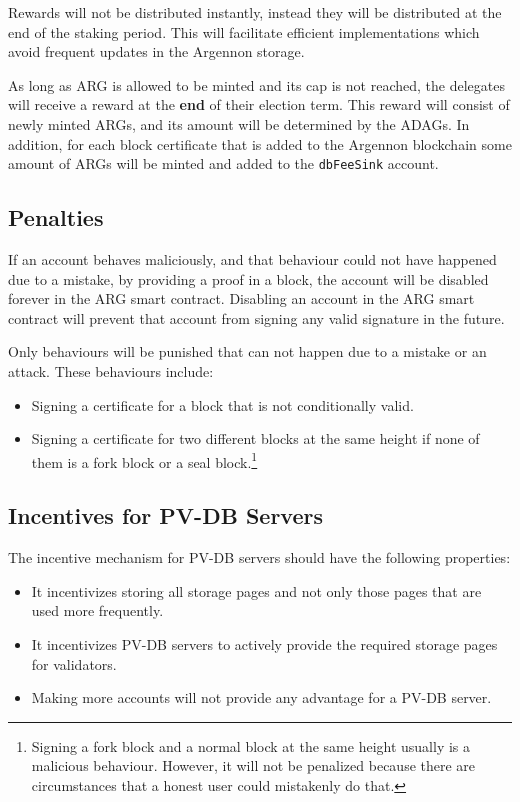 Rewards will not be distributed instantly, instead they will be distributed at the end of the staking period.
This will facilitate efficient implementations which avoid frequent updates in the Argennon storage.

As long as ARG is allowed to be minted and its cap is not reached, the delegates will receive a reward at the
\textbf{end} of their election term. This reward will consist of newly minted ARGs, and its amount will be
determined by the ADAGs. In addition, for each block certificate that is added to the Argennon blockchain some amount
of ARGs will be minted and added to the \texttt{dbFeeSink} account.

\subsection{Penalties}\label{subsec:penalties}

If an account behaves maliciously, and that behaviour could not have happened due to a mistake, by providing a proof
in a block, the account will be disabled forever in the ARG smart contract. Disabling an account in the
ARG smart contract will prevent that account from signing any valid signature in the future.

Only behaviours will be punished that can not happen due to a mistake or an attack. These behaviours include:
\begin{itemize}
    \item Signing a certificate for a block that is not conditionally valid.
    \item Signing a certificate for two different blocks at the same height if none of them
    is a fork block or a seal block.\footnote{Signing
    a fork block and a normal block at the same height usually is a malicious behaviour. However, it will not be
    penalized because there are circumstances that a honest user could mistakenly do that.}
\end{itemize}

\subsection{Incentives for PV-DB Servers}\label{subsec:PV-DB-servers}

The incentive mechanism for PV-DB servers should have the following properties:

\begin{itemize}
    \item It incentivizes storing all storage pages and not only those pages that are used more frequently.
    \item It incentivizes PV-DB servers to actively provide the required storage pages for validators.
    \item Making more accounts will not provide any advantage for a PV-DB server.
\end{itemize}

